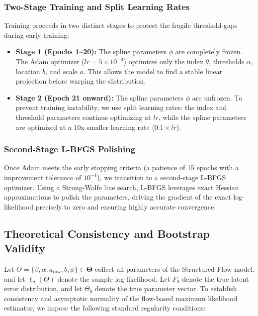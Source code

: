 \documentclass{article}
\numberwithin{figure}{section}
\numberwithin{table}{section}
\numberwithin{equation}{section}
\begin{document}
\subsubsection{Two-Stage Training and Split Learning Rates}
Training proceeds in two distinct stages to protect the fragile threshold-gaps during early training:
\begin{itemize}
    \item \textbf{Stage 1 (Epochs 1--20):} The spline parameters $\phi$ are completely frozen. The Adam optimizer ($lr = 5 \times 10^{-3}$) optimizes only the index $\theta$, thresholds $\alpha$, location $b$, and scale $a$. This allows the model to find a stable linear projection before warping the distribution.
    \item \textbf{Stage 2 (Epoch 21 onward):} The spline parameters $\phi$ are unfrozen. To prevent training instability, we use split learning rates: the index and threshold parameters continue optimizing at $lr$, while the spline parameters are optimized at a 10x smaller learning rate ($0.1 \times lr$).
\end{itemize}

\subsubsection{Second-Stage L-BFGS Polishing}
Once Adam meets the early stopping criteria (a patience of 15 epochs with a improvement tolerance of $10^{-4}$), we transition to a second-stage L-BFGS optimizer. Using a Strong-Wolfe line search, L-BFGS leverages exact Hessian approximations to polish the parameters, driving the gradient of the exact log-likelihood precisely to zero and ensuring highly accurate convergence.


\clearpage

\subsection{Theoretical Consistency and Bootstrap Validity}
\label{appsub:bootstrap_proof}

Let $\Theta = \{\beta, \alpha, a_{\text{raw}}, b, \phi\} \in \boldsymbol{\Theta}$ collect all parameters of the Structured Flow model, and let $\ell_n(\Theta)$ denote the sample log-likelihood. Let $F_0$ denote the true latent error distribution, and let $\Theta_0$ denote the true parameter vector. To establish consistency and asymptotic normality of the flow-based maximum likelihood estimator, we impose the following standard regularity conditions:
\end{document}
